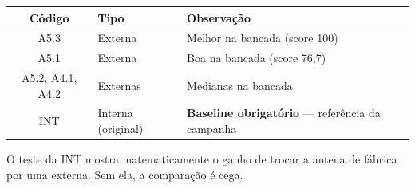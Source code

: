 \documentclass[a4paper,10pt]{article}
\begin{document}
\vspace{3pt}

\begin{tcolorbox}[cxa, title={Antenas a testar}]
\small
\begin{center}
\begin{tabular}{cll}
\toprule
\textbf{Código} & \textbf{Tipo} & \textbf{Observação} \\
\midrule
A5.3 & Externa & Melhor na bancada (score 100) \\
A5.1 & Externa & Boa na bancada (score 76,7) \\
A5.2, A4.1, A4.2 & Externas & Medianas na bancada \\
INT  & Interna (original) & \textbf{Baseline obrigatório} --- referência da campanha \\
\bottomrule
\end{tabular}
\end{center}
\vspace{1pt}
{\color{tscinza}\footnotesize O teste da INT mostra matematicamente o ganho de
trocar a antena de fábrica por uma externa. Sem ela, a comparação é cega.}
\end{tcolorbox}

\vspace{3pt}
\end{document}
